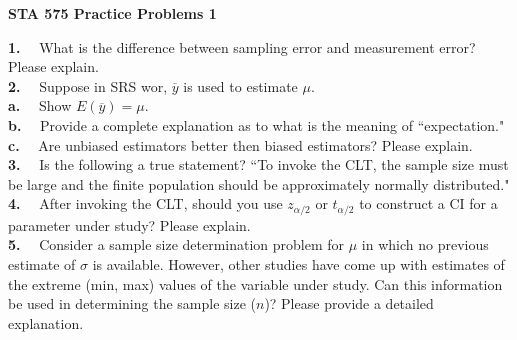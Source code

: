 \hoffset=0in
\voffset=0in
\topmargin -1.0in
\headheight 0.0in
\textheight 10.50in 
\footheight 0.0in
\footskip 0.0in
\oddsidemargin -0.0in
\evensidemargin 0.0in 
\textwidth 6.5in



\pagestyle{empty}

\vspace*{0.5in}

\centerline{\bf STA 575 Practice Problems 1} 

\parindent 0pt

\vspace*{0.5in}


{\bf 1.} \ \ What is the difference between sampling error and measurement error?  Please explain. \\

{\bf 2.} \ \ Suppose in SRS wor, $\overline{y}$ is used to estimate $\mu$. \\
{\bf a.} \ \ Show $E(\overline{y}) = \mu$. \\
{\bf b.} \ \ Provide a complete explanation as to what is the meaning of ``expectation." \\
{\bf c.} \ \ Are unbiased estimators better then biased estimators?  
Please explain. \\

{\bf 3.} \ \ Is the following a true statement? ``To invoke the CLT,
the sample size must be large and the finite population should be approximately normally distributed." \\
 
{\bf 4.} \ \ After invoking the CLT, should you use $z_{\alpha/2}$ or
$t_{\alpha/2}$ to construct a CI for a parameter under study? 
Please explain.  \\

{\bf 5.} \ \ Consider a sample size determination problem for $\mu$
in which no previous estimate of $\sigma$ is available.  However,
other studies have come up with estimates of the extreme (min, max) 
values of the variable under study.  Can this information be used in
determining the sample size ($n$)?  Please provide a detailed explanation. \\

